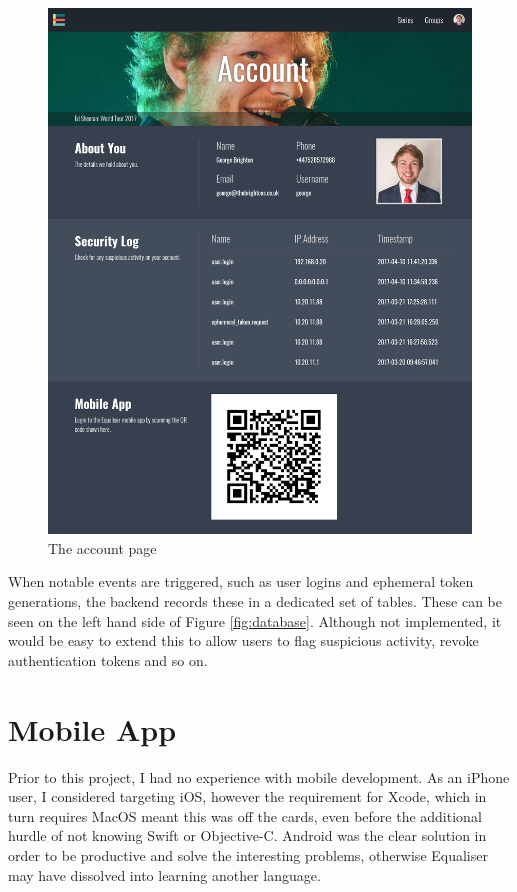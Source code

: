 \documentclass[12pt,a4paper]{bhamdissertation}
\begin{document}
\begin{figure}[!htbp]
    \centering
    \includegraphics[width=1\linewidth]{img/account.png}
    \caption{The account page}
    \label{img:account}
\end{figure}

When notable events are triggered, such as user logins and ephemeral token generations, the backend records these in a dedicated set of tables. These can be seen on the left hand side of Figure \ref{fig:database}. Although not implemented, it would be easy to extend this to allow users to flag suspicious activity, revoke authentication tokens and so on.

\section{Mobile App}


Prior to this project, I had no experience with mobile development. As an iPhone user, I considered targeting iOS, however the requirement for Xcode, which in turn requires MacOS meant this was off the cards, even before the additional hurdle of not knowing Swift or Objective-C. Android was the clear solution in order to be productive and solve the interesting problems, otherwise Equaliser may have dissolved into learning another language.
\end{document}
